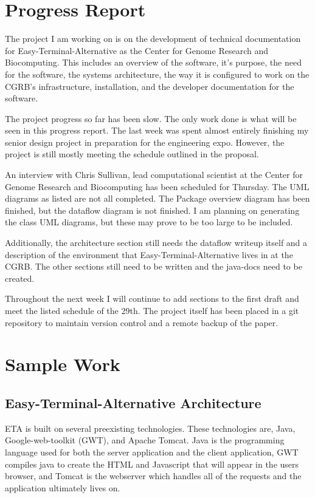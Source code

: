 \documentclass[a4paper,12pt]{texMemo}
\begin{document}
\maketitle

\section{Progress Report}
The project I am working on is on the development of technical documentation for Easy-Terminal-Alternative as the Center for Genome Research and Biocomputing. This includes an overview of the software, it's purpose, the need for the software, the systems architecture, the way it is configured to work on the CGRB's infrastructure, installation, and the developer documentation for the software. 

The project progress so far has been slow. The only work done is what will be seen in this progress report. The last week was spent almost entirely finishing my senior design project in preparation for the engineering expo. However, the project is still mostly meeting the schedule outlined in the proposal.

An interview with Chris Sullivan, lead computational scientist at the Center for Genome Research and Biocomputing has been scheduled for Thursday. The UML diagrams as listed are not all completed. The Package overview diagram has been finished, but the dataflow diagram is not finished. I am planning on generating the class UML diagrams, but these may prove to be too large to be included. 

Additionally, the architecture section still needs the dataflow writeup itself and a description of the environment that Easy-Terminal-Alternative lives in at the CGRB. The other sections still need to be written and the java-docs need to be created.

Throughout the next week I will continue to add sections to the first draft and meet the listed schedule of the 29th. The project itself has been placed in a git repository to maintain version control and a remote backup of the paper.
\newpage

\section{Sample Work}
\subsection{Easy-Terminal-Alternative Architecture}
ETA is built on several preexisting technologies. These technologies are, Java, Google-web-toolkit (GWT), and Apache Tomcat. Java is the programming language used for both the server application and the client application, GWT compiles java  to create the HTML and Javascript that will appear in the users browser, and Tomcat is the webserver which handles all of the requests and the application ultimately lives on.
\end{document}
